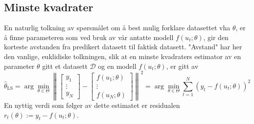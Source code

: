 \subsection{Minste kvadrater}
\label{sec:minste_kvadrater}
En naturlig tolkning av spørsmålet om å best mulig forklare datasettet vha $\theta$, er å finne parameteren som ved bruk av vår antatte modell $f(u_t; \theta)$, gir den korteste avstanden fra predikert datasett til faktisk datasett. "Avstand" har her den vanlige, euklidiske tolkningen, slik at en minste kvadraters estimator av en parameter $\theta$ gitt et datasett $\mathcal{D}$ og en modell $f(u_t; \theta)$, er gitt av
\begin{equation}
\widehat{\theta}_{\mathrm{LS}}=\arg \min _{\theta \in \Theta}\left\|\left[\begin{array}{c}
{y_{1}} \\
{\vdots} \\
{y_{N}}
\end{array}\right]-\left[\begin{array}{c}
{f\left(u_{1} ; \theta\right)} \\
{\vdots} \\
{f\left(u_{N} ; \theta\right)}
\end{array}\right]\right\|^{2}=\arg \min _{\theta \in \Theta} \sum_{t=1}^{N}\left(y_{t}-f\left(u_{t} ; \theta\right)\right)^{2}
\end{equation}
En nyttig verdi som følger av dette estimatet er residualen $r_{t}(\theta):=y_{t}-f\left(u_{t} ; \theta\right)$.


